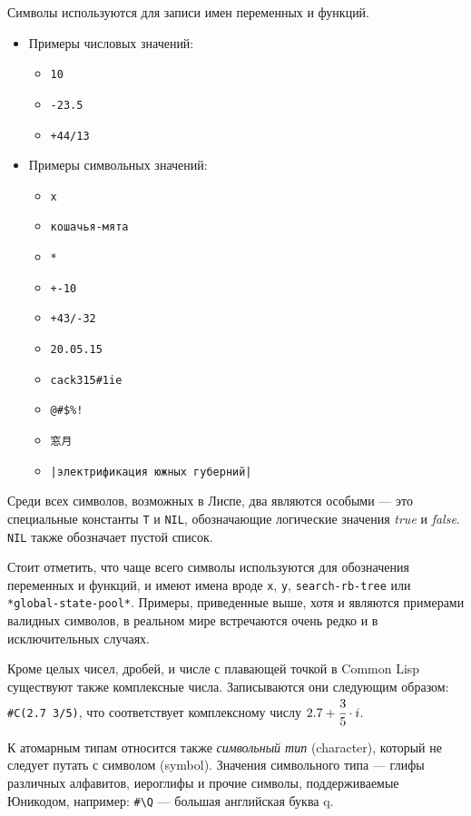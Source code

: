 \documentclass[a4paper, 12pt, titlepage, twoside]{article}
\begin{document}
Символы используются для записи имен переменных и функций.
\begin{itemize}
  \renewcommand{\labelitemii}{$\bullet$}
\item[] Примеры числовых значений:
  \begin{itemize}
  \item \verb|10|
  \item \verb|-23.5|
  \item \verb|+44/13|
  \end{itemize}
\item[] Примеры символьных значений:
  \begin{itemize}
  \item \verb|x|
  \item \verb|кошачья-мята|
  \item \verb|*|
  \item \verb|+-10|
  \item \verb|+43/-32|
  \item \texttt{20.05.15}
  \item \verb|cack315#1ie|
  \item \verb|@#$%!|
  \item \begin{CJK}{UTF8}{min}\verb|窓月|\end{CJK} %
  \item \verb#|электрификация южных губерний|#
  \end{itemize}
\end{itemize}
Среди всех символов, возможных в Лиспе, два являются особыми --- это специальные константы \verb|T| и \verb|NIL|, обозначающие логические значения \textit{true} и \textit{false}. \verb|NIL| также обозначает пустой список.

Стоит отметить, что чаще всего символы используются для обозначения переменных и функций, и имеют имена вроде \texttt{x}, \texttt{y}, \texttt{search-rb-tree} или \texttt{*global-state-pool*}. Примеры, приведенные выше, хотя и являются примерами валидных символов, в реальном мире встречаются очень редко и в исключительных случаях.

Кроме целых чисел, дробей, и числе с плавающей точкой в Common Lisp существуют также комплексные числа. Записываются они следующим образом: \texttt{\#C(2.7 3/5)}, что соответствует комплексному числу \(2.7+\cfrac{3}{5}\cdot{}i\).

К атомарным типам относится также \textit{символьный тип} (character), который не следует путать с символом (symbol). Значения символьного типа --- глифы различных алфавитов, иероглифы и прочие символы, поддерживаемые Юникодом, например: \texttt{\#\textbackslash{}Q} --- большая английская буква q.
\end{document}
